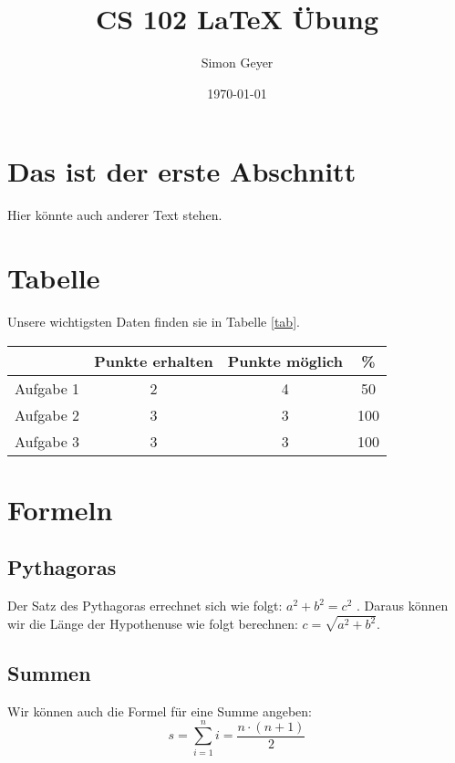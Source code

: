 \documentclass{scrartcl}
\author{Simon Geyer}
\date{\today}
\title{CS 102 \LaTeX{} Übung}
\begin{document}
\maketitle

\section{Das ist der erste Abschnitt}
Hier könnte auch anderer Text stehen.

\section{Tabelle}
Unsere wichtigsten Daten finden sie in Tabelle \ref{tab}.
\begin{center}
\begin{tabularx}{0.78\textwidth}{X|c|c|c}
& Punkte erhalten & Punkte möglich & \% \\
\hline
Aufgabe 1 & 2 & 4 & 50\\
Aufgabe 2 & 3 & 3 & 100\\
Aufgabe 3 & 3 & 3 & 100\\
\end{tabularx}
\label{tab}
\end{center}

\section{Formeln}

\subsection{Pythagoras}
Der Satz des Pythagoras errechnet sich wie folgt: $a^2 + b^2 = c^2$ . Daraus können
wir die Länge der Hypothenuse wie folgt berechnen: $c = \sqrt{a^2 + b^2}$.

\subsection{Summen}
Wir können auch die Formel für eine Summe angeben:
\begin{equation}
s = \sum_{i=1}^{n} i = \frac{n\cdot (n + 1)}{2}
\end{equation}
\end{document}
